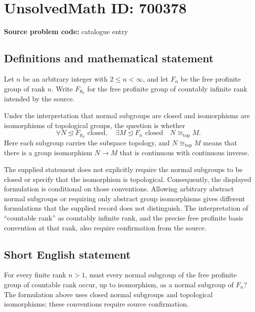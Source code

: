 \documentclass[11pt]{article}
\begin{document}
\section*{UnsolvedMath ID: 700378}
\textbf{Source problem code:} catalogue entry
\subsection{Definitions and mathematical statement}
Let \(n\) be an arbitrary integer with \(2\leq n<\infty\), and let \(F_n\) be the free profinite group of rank \(n\). Write \(F_{\aleph_0}\) for the free profinite group of countably infinite rank intended by the source.

Under the interpretation that normal subgroups are closed and isomorphisms are isomorphisms of topological groups, the question is whether
\[
\forall N\trianglelefteq F_{\aleph_0}\text{ closed},\quad
\exists M\trianglelefteq F_n\text{ closed}\quad
N\cong_{\mathrm{top}} M.
\]
Here each subgroup carries the subspace topology, and \(N\cong_{\mathrm{top}}M\) means that there is a group isomorphism \(N\to M\) that is continuous with continuous inverse.

The supplied statement does not explicitly require the normal subgroups to be closed or specify that the isomorphism is topological. Consequently, the displayed formulation is conditional on those conventions. Allowing arbitrary abstract normal subgroups or requiring only abstract group isomorphisms gives different formulations that the supplied record does not distinguish. The interpretation of ``countable rank'' as countably infinite rank, and the precise free profinite basis convention at that rank, also require confirmation from the source.
\subsection{Short English statement}
For every finite rank \(n>1\), must every normal subgroup of the free profinite group of countable rank occur, up to isomorphism, as a normal subgroup of \(F_n\)? The formulation above uses closed normal subgroups and topological isomorphisms; these conventions require source confirmation.
\end{document}
